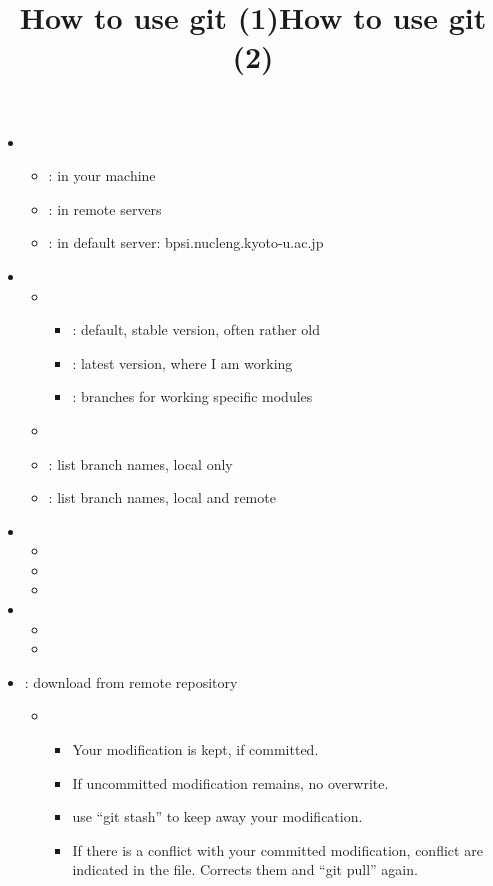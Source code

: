 \documentclass[12pt]{article}
\begin{document}
\title{How to use git (1)}
\begin{itemize}
\item
{}
\begin{itemize}
\item
{}: in your machine
\item
{}: in remote servers
\item
{}: in default server: bpsi.nucleng.kyoto-u.ac.jp
\end{itemize}
\item
{}
\begin{itemize}
\item
{}
\begin{itemize}
\item
{}: default, stable version, often rather old
\item
{}: latest version, where I am working
\item
{}: branches for working specific modules
\end{itemize}
\item
{}
\item
{}\qquad : list branch names, local only
\item
{}\qquad : list branch names, local and remote
\end{itemize}
\end{itemize}

\title{How to use git (2)}
\begin{itemize}
\item
{}
\begin{itemize}
\item
{}
\item
{}
\item
{}
\end{itemize}
\item
{}
\begin{itemize}
\item
{}
\item
{}
\end{itemize}
\item
{}: download from remote repository
\begin{itemize}
\item
{}
\begin{itemize}
\item
Your modification is kept, if committed.
\item
If uncommitted modification remains, no overwrite.
\item
use ``git stash'' to keep away your modification.
\item
If there is a conflict with your committed modification, conflict
are indicated in the file. Corrects them and ``git pull'' again.
\end{itemize}
\end{itemize}
\end{itemize}
\end{document}
